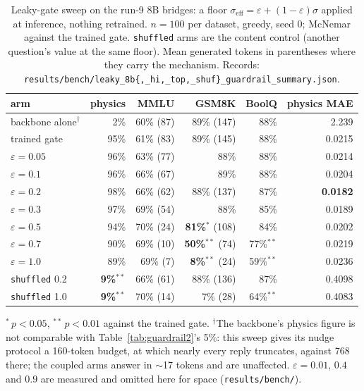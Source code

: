\documentclass[11pt]{article}
\newcommand{\code}[1]{\texttt{#1}}
\begin{document}
\begin{table}[t]
\centering
\caption{Leaky-gate sweep on the run-9 8B bridges: a floor $\sigma_{\text{eff}} = \varepsilon + (1-\varepsilon)\sigma$ applied at inference, nothing retrained. $n{=}100$ per dataset, greedy, seed 0; McNemar against the trained gate. \code{shuffled} arms are the content control (another question's value at the same floor). Mean generated tokens in parentheses where they carry the mechanism. Records: \code{results/bench/leaky\_8b\{,\_hi,\_top,\_shuf\}\_guardrail\_summary.json}.}
\label{tab:leaky}
\small
\begin{tabular}{lrrrrr}
\toprule
arm & physics & MMLU & GSM8K & BoolQ & physics MAE \\
\midrule
backbone alone$^{\dagger}$ & 2\% & 60\% (87) & 89\% (147) & 88\% & 2.239 \\
trained gate & 95\% & 61\% (83) & 89\% (145) & 88\% & 0.0215 \\
\midrule
$\varepsilon = 0.05$ & 96\% & 63\% (77) & 88\% & 88\% & 0.0214 \\
$\varepsilon = 0.1$ & 96\% & 66\% (67) & 89\% & 88\% & 0.0204 \\
$\varepsilon = 0.2$ & 98\% & 66\% (62) & 88\% (137) & 87\% & \textbf{0.0182} \\
$\varepsilon = 0.3$ & 97\% & 69\% (54) & 88\% & 85\% & 0.0189 \\
$\varepsilon = 0.5$ & 94\% & 70\% (24) & \textbf{81\%}$^{*}$ (108) & 84\% & 0.0202 \\
$\varepsilon = 0.7$ & 90\% & 69\% (10) & \textbf{50\%}$^{**}$ (74) & 77\%$^{**}$ & 0.0219 \\
$\varepsilon = 1.0$ & 89\% & 69\% (7) & \textbf{8\%}$^{**}$ (24) & 59\%$^{**}$ & 0.0236 \\
\midrule
\code{shuffled} 0.2 & \textbf{9\%}$^{**}$ & 66\% (61) & 88\% (136) & 87\% & 0.4098 \\
\code{shuffled} 1.0 & \textbf{9\%}$^{**}$ & 70\% (14) & 7\% (28) & 64\%$^{**}$ & 0.4083 \\
\bottomrule
\end{tabular}

\footnotesize $^{*}\,p < 0.05$, $^{**}\,p < 0.01$ against the trained gate. $^{\dagger}$The backbone's physics figure is not comparable with Table~\ref{tab:guardrail2}'s 5\%: this sweep gives its nudge protocol a 160-token budget, at which nearly every reply truncates, against 768 there; the coupled arms answer in $\sim$17 tokens and are unaffected. $\varepsilon = 0.01$, $0.4$ and $0.9$ are measured and omitted here for space (\code{results/bench/}).
\end{table}
\end{document}
